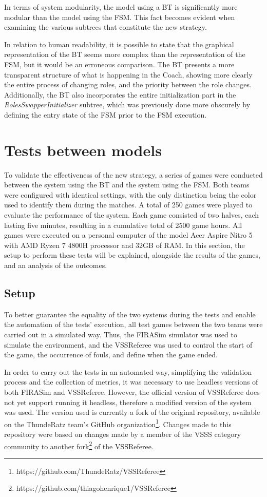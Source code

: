 In terms of system modularity, the model using a BT is significantly more modular than the model using the FSM. This fact becomes evident when examining the various subtrees that constitute the new strategy.

In relation to human readability, it is possible to state that the graphical representation of the BT seems more complex than the representation of the FSM, but it would be an erroneous comparison. The BT presents a more transparent structure of what is happening in the Coach, showing more clearly the entire process of changing roles, and the priority between the role changes. Additionally, the BT also incorporates the entire initialization part in the \textit{RolesSwapperInitializer} subtree, which was previously done more obscurely by defining the entry state of the FSM prior to the FSM execution.

\section{Tests between models}

To validate the effectiveness of the new strategy, a series of games were conducted between the system using the BT and the system using the FSM. Both teams were configured with identical settings, with the only distinction being the color used to identify them during the matches. A total of 250 games were played to evaluate the performance of the system. Each game consisted of two halves, each lasting five minutes, resulting in a cumulative total of 2500 game hours. All games were executed on a personal computer of the model Acer Aspire Nitro 5 with AMD Ryzen 7 4800H processor and 32GB of RAM. In this section, the setup to perform these tests will be explained, alongside the results of the games, and an analysis of the outcomes.

\subsection{Setup}

To better guarantee the equality of the two systems during the tests and enable the automation of the tests' execution, all test games between the two teams were carried out in a simulated way. Thus, the FIRASim simulator was used to simulate the environment, and the VSSReferee was used to control the start of the game, the occurrence of fouls, and define when the game ended.

In order to carry out the tests in an automated way, simplifying the validation process and the collection of metrics, it was necessary to use headless versions of both FIRASim and VSSReferee. However, the official version of VSSReferee does not yet support running it headless, therefore a modified version of the system was used. The version used is currently a fork of the original repository, available on the ThundeRatz team's GitHub organization\footnote{https://github.com/ThundeRatz/VSSReferee}. Changes made to this repository were based on changes made by a member of the VSSS category community to another fork\footnote{https://github.com/thiagohenrique1/VSSReferee} of the VSSReferee.

